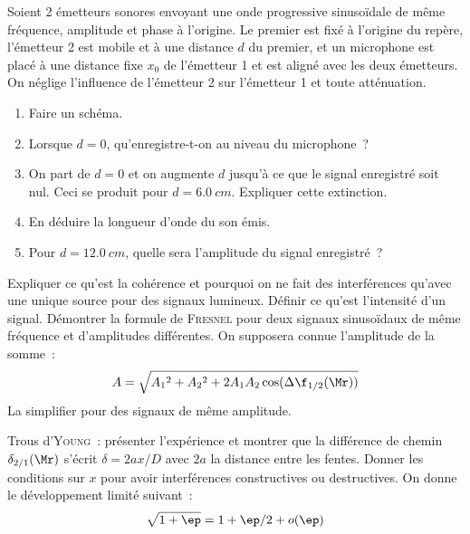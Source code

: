 \documentclass[a4paper, 12pt, final, garamond]{book}
\begin{document}
\begin{enumerate}
	\litem{\str}%
	Soient 2 émetteurs sonores envoyant une onde progressive
	sinusoïdale de même fréquence, amplitude et phase à l'origine. Le premier
	est fixé à l'origine du repère, l'émetteur 2 est mobile et à une distance
	$d$ du premier, et un microphone est placé à une distance fixe $x_0$ de
	l'émetteur 1 et est aligné avec les deux émetteurs. On néglige l'influence
	de l'émetteur 2 sur l'émetteur 1 et toute atténuation.
	\begin{enumerate}[label=\sqenumi]
		\item Faire un schéma.
		\item Lorsque $d=0$, qu'enregistre-t-on au niveau du microphone~?
		\item On part de $d=0$ et on augmente $d$ jusqu'à ce que le signal
		      enregistré soit nul. Ceci se produit pour $d = \SI{6.0}{cm}$.
		      Expliquer cette extinction.
		\item En déduire la longueur d'onde du son émis.
		\item Pour $d = \SI{12.0}{cm}$, quelle sera l'amplitude du signal
		      enregistré~?
	\end{enumerate}
	\litem{\strr}%
	Expliquer ce qu'est la cohérence et pourquoi on ne fait des
	interférences qu'avec une unique source pour des signaux lumineux. Définir
	ce qu'est l'intensité d'un signal. Démontrer la formule de \textsc{Fresnel}
	pour deux signaux sinusoïdaux de même fréquence et d'amplitudes différentes.
	On supposera connue l'amplitude de la somme~:
	\[
		A = \sqrt{A_1{}^{2} + A_2{}^{2} + 2A_1A_2 \cos(\Delta{\f}_{1/2}(\Mr))}
	\]
	La simplifier pour des signaux de même amplitude.

	\litem{\strr}%
	Trous d'\textsc{Young}~: présenter l'expérience et montrer que la
	différence de chemin $\delta_{2/1}(\Mr)$ s'écrit \hfill $\delta =
		2ax/D$ avec $2a$ la distance entre les fentes. Donner les conditions sur
	$x$ pour avoir interférences constructives ou destructives.
	\smallbreak
	On donne le développement limité suivant~:
	\[\sqrt{1+\ep} = 1 + \ep/2 + o(\ep)\]
\end{enumerate}
\end{document}
